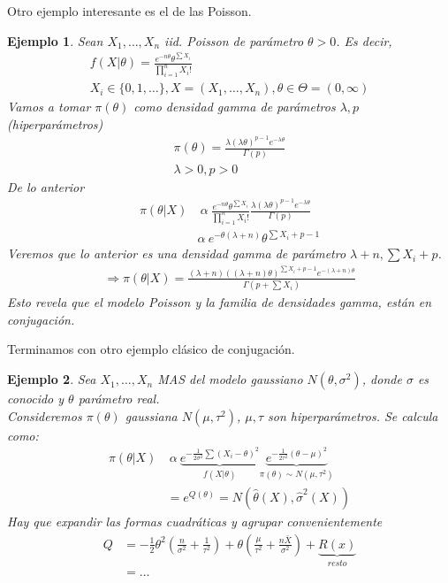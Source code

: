 \documentclass[10pt]{article}
\theoremstyle{plain}
\newtheorem{ej}{Ejemplo}
\theoremstyle{definition}
\begin{document}
Otro ejemplo interesante es el de las Poisson.
\begin{ej}
Sean $X_{1},\ldots,X_{n}$ iid. Poisson de parámetro $\theta>0$. Es decir,
\begin{align*}
f(X|\theta) = \frac{e^{-n\theta}\theta^{\sum X_{i}}}{\prod_{i=1}^{n}X_{i}!}\\
X_{i} \in \{0,1,\ldots\}, X = (X_{1},\ldots,X_{n}), \theta \in \Theta = (0,\infty)
\end{align*}
Vamos a tomar $\pi(\theta)$ como densidad gamma de parámetros $\lambda, p$ (hiperparámetros)
\begin{align*}
\pi(\theta) = \frac{\lambda (\lambda\theta)^{p-1}e^{-\lambda\theta}}{\Gamma(p)}\\
\lambda>0, p>0
\end{align*}
De lo anterior
\begin{align*}
\pi(\theta|X) &\ \alpha\ \frac{e^{-n\theta}\theta^{\sum X_{i}}}{\prod_{i=1}^n X_{i}!} \frac{\lambda (\lambda\theta)^{p-1}e^{-\lambda\theta}}{\Gamma(p)}\\
&\alpha\ e^{-\theta(\lambda+n)}\theta^{\sum X_{i}+p-1}
\end{align*}
Veremos que lo anterior es una densidad gamma de parámetro $\lambda+n,\sum X_{i} + p$.\\
\begin{align*}
\Rightarrow \pi(\theta|X) = \frac{(\lambda+n)((\lambda+n)\theta)^{\sum X_{i} + p - 1}e^{-(\lambda+n)\theta}}{\Gamma(p+\sum X_{i})}
\end{align*}
Esto revela que el modelo Poisson y la familia de densidades gamma, están en conjugación.
\end{ej}
Terminamos con otro ejemplo clásico de conjugación.
\begin{ej}
Sea $X_{1},\ldots,X_{n}$ MAS del modelo gaussiano $N(\theta,\sigma^2)$, donde $\sigma$ es conocido y $\theta$ parámetro real.\\
Consideremos $\pi(\theta)$ gaussiana $N(\mu,\tau^2)$, $\mu,\tau$ son hiperparámetros. Se calcula como:
\begin{align*}
\pi(\theta|X) &\ \alpha\ \underbrace{e^{-\frac{1}{2\sigma^2}\sum (X_{i}-\theta)^{2}}}_{f(X|\theta)}\underbrace{e^{-\frac{1}{2\tau^2}(\theta-\mu)^2}}_{\pi(\theta)\sim N(\mu,\tau^2)}\\
&= e^{Q(\theta)} = N(\hat{\theta}(X),\hat{\sigma}^2(X))
\end{align*}
Hay que expandir las formas cuadráticas y agrupar convenientemente
\begin{align*}
Q &= -\frac{1}{2}\theta^2\left(\frac{n}{\sigma^2}+\frac{1}{\tau^2}\right) + \theta \left(\frac{\mu}{\tau^2}+\frac{n\bar{X}}{\sigma^2}\right) + \underbrace{R(x)}_{resto}\\
&= \ldots
\end{align*}
\end{ej}
\end{document}
